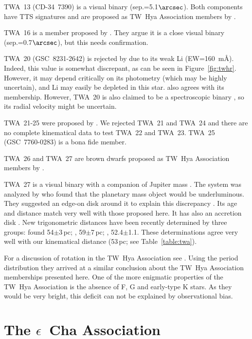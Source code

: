 \documentclass[11pt,twoside]{book}
\begin{document}
TWA~13 (CD-34~7390) is a visual binary (sep.=5.1$\arcsec$).
Both components have TTS signatures and are proposed as
TW~Hya Association members by \citet{sterzik99}.

TWA~16 is  a member proposed by \citet{zuckerman01c}.
They argue it is a close visual binary (sep.=0.7$\arcsec$), but this needs confirmation.


TWA~20 (GSC~8231-2642)  is rejected by \citet{song03} due to its weak Li (EW=160~m\AA).
Indeed, this value is somewhat discrepant, as  can be seen in Figure~\ref{fig:twhr}.
However, it may depend critically on its photometry (which may be highly uncertain),
and Li may easily be depleted in this star.
\citet{mamajek05} also agrees with its membership.
However, TWA~20 is also claimed to be a spectroscopic binary \citep{Ray06},
so its radial velocity might be uncertain.

TWA~21-25 were proposed by \citet{song03}.
We rejected TWA~21 and TWA~24 and there are no complete kinematical data to test TWA~22 and TWA~23.
TWA~25 (GSC~7760-0283) is a bona fide member.

TWA~26 and TWA~27 are brown dwarfs proposed as  TW~Hya Association members by
\citet{gizis02}.

TWA~27 is a visual binary with a companion of Jupiter mass \citep{chauvin04,chauvin05a}.
The system was analyzed by \citet{mohanty07} who found that the planetary mass
object would be underluminous.
They suggested an edge-on disk around it to explain this discrepancy \cite[but see] []{marley07}.
Its age and distance match very well with those proposed here.
It has also an accretion disk \citep{riaz06, riaz07}.
New trigonometric distances have been recently determined by three groups:
\citet{gizis07} found 54$\pm$3\,pc;
\citet{biller07},  59$\pm$7\,pc; \citet{ducourant07}, 52.4$\pm$1.1.
These determinations agree very well with our kinematical distance (53\,pc; see
Table~\ref{table:twa}).

For a discussion of rotation in the TW~Hya Association see \citet{lawson05}.
Using the period distribution they arrived at a similar conclusion about the
TW~Hya Association memberships presented here.
One of the more enigmatic properties of  the TW~Hya Association is the absence
of F, G and early-type K stars.
As they would be very bright, this deficit can not be explained by observational bias.


\section{The $\epsilon$~Cha Association }
\end{document}
